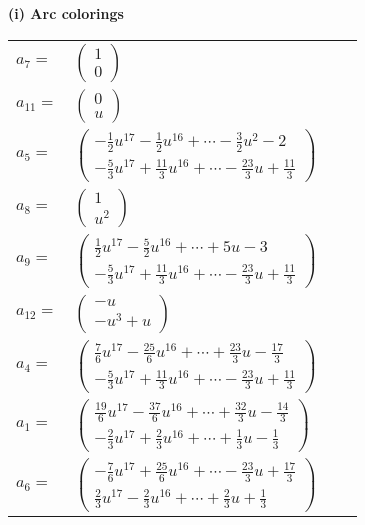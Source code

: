 \documentclass[1p]{elsarticle_modified}
\theoremstyle{definition}
\begin{document}
\flushleft \textbf{(i) Arc colorings}\\
\begin{tabular}{m{7pt} m{180pt} m{7pt} m{180pt} }
\flushright $a_{7}=$&$\begin{pmatrix}1\\0\end{pmatrix}$ \\
\flushright $a_{11}=$&$\begin{pmatrix}0\\u\end{pmatrix}$ \\
\flushright $a_{5}=$&$\begin{pmatrix}-\frac{1}{2} u^{17}-\frac{1}{2} u^{16}+\cdots-\frac{3}{2} u^2-2\\-\frac{5}{3} u^{17}+\frac{11}{3} u^{16}+\cdots-\frac{23}{3} u+\frac{11}{3}\end{pmatrix}$ \\
\flushright $a_{8}=$&$\begin{pmatrix}1\\u^2\end{pmatrix}$ \\
\flushright $a_{9}=$&$\begin{pmatrix}\frac{1}{2} u^{17}-\frac{5}{2} u^{16}+\cdots+5 u-3\\-\frac{5}{3} u^{17}+\frac{11}{3} u^{16}+\cdots-\frac{23}{3} u+\frac{11}{3}\end{pmatrix}$ \\
\flushright $a_{12}=$&$\begin{pmatrix}- u\\- u^3+u\end{pmatrix}$ \\
\flushright $a_{4}=$&$\begin{pmatrix}\frac{7}{6} u^{17}-\frac{25}{6} u^{16}+\cdots+\frac{23}{3} u-\frac{17}{3}\\-\frac{5}{3} u^{17}+\frac{11}{3} u^{16}+\cdots-\frac{23}{3} u+\frac{11}{3}\end{pmatrix}$ \\
\flushright $a_{1}=$&$\begin{pmatrix}\frac{19}{6} u^{17}-\frac{37}{6} u^{16}+\cdots+\frac{32}{3} u-\frac{14}{3}\\-\frac{2}{3} u^{17}+\frac{2}{3} u^{16}+\cdots+\frac{1}{3} u-\frac{1}{3}\end{pmatrix}$ \\
\flushright $a_{6}=$&$\begin{pmatrix}-\frac{7}{6} u^{17}+\frac{25}{6} u^{16}+\cdots-\frac{23}{3} u+\frac{17}{3}\\\frac{2}{3} u^{17}-\frac{2}{3} u^{16}+\cdots+\frac{2}{3} u+\frac{1}{3}\end{pmatrix}$ \\

\end{tabular}
\end{document}
